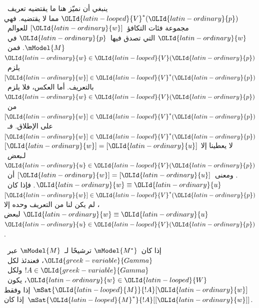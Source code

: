 \documentclass[../../../include/open-logic-section]{subfiles}
\begin{document}
ينبغي أن نميّز هنا ما يقتضيه تعريف~${\OLId{latin-looped}{V}}^*({\OLId{latin-ordinary}{p}})$
مما لا يقتضيه. فهي مجموعة فئات التكافؤ~$[{\OLId{latin-ordinary}{w}}]$
للعوالم~${\OLId{latin-ordinary}{w}}$ التي تصدق فيها~${\OLId{latin-ordinary}{p}}$ في~$\mModel{M}$.
فمن~${\OLId{latin-ordinary}{w}} \in {\OLId{latin-looped}{V}}({\OLId{latin-ordinary}{p}})$ يلزم~$[{\OLId{latin-ordinary}{w}}] \in {\OLId{latin-looped}{V}}^*({\OLId{latin-ordinary}{p}})$
بالتعريف. أما العكس، فلا يلزم~${\OLId{latin-ordinary}{w}} \in {\OLId{latin-looped}{V}}({\OLId{latin-ordinary}{p}})$
من~$[{\OLId{latin-ordinary}{w}}] \in {\OLId{latin-looped}{V}}^*({\OLId{latin-ordinary}{p}})$ على الإطلاق.
فـ~$[{\OLId{latin-ordinary}{w}}] \in {\OLId{latin-looped}{V}}^*({\OLId{latin-ordinary}{p}})$ لا يعطينا إلا
$[{\OLId{latin-ordinary}{w}}]=[{\OLId{latin-ordinary}{u}}]$ لـ\emph{بعض}~${\OLId{latin-ordinary}{u}} \in {\OLId{latin-looped}{V}}({\OLId{latin-ordinary}{p}})$.
ومعنى~$[{\OLId{latin-ordinary}{w}}]=[{\OLId{latin-ordinary}{u}}]$ أن~${\OLId{latin-ordinary}{w}} \equiv {\OLId{latin-ordinary}{u}}$.
فإذا كان~$[{\OLId{latin-ordinary}{w}}] \in {\OLId{latin-looped}{V}}^*({\OLId{latin-ordinary}{p}})$، لم يكن لنا من
التعريف وحده إلا ${\OLId{latin-ordinary}{w}} \equiv {\OLId{latin-ordinary}{u}}$ لبعض~${\OLId{latin-ordinary}{u}} \in {\OLId{latin-looped}{V}}({\OLId{latin-ordinary}{p}})$.

\begin{thm}
  إذا كان~$\mModel{M^*}$ ترشيحًا لـ~$\mModel{M}$ عبر~${\OLId{greek-variable}{Gamma}}$، فعندئذ
  لكل~$!A \in {\OLId{greek-variable}{Gamma}}$ ولكل~${\OLId{latin-ordinary}{w}} \in {\OLId{latin-looped}{W}}$، يكون~$\mSat{{\OLId{latin-looped}{M}}}{!A}[{\OLId{latin-ordinary}{w}}]$ إذا
  وفقط إذا كان~$\mSat{{\OLId{latin-looped}{M}}^*}{!A}[{[{\OLId{latin-ordinary}{w}}]}]$.
\end{thm}
\end{document}
